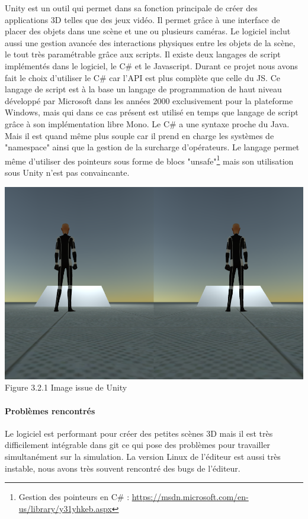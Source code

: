 \documentclass[12pt,a4paper]{report}
\begin{document}
Unity est un outil qui permet dans sa fonction principale de créer des applications 3D telles que des jeux vidéo. Il permet grâce à une interface de placer des objets dans une scène et une ou plusieurs caméras. Le logiciel inclut aussi une gestion avancée des interactions physiques entre les objets de la scène, le tout très paramétrable grâce aux scripts. Il existe deux langages de script implémentés dans le logiciel, le C\# et le Javascript. Durant ce projet nous avons fait le choix d'utiliser le C\# car l'API est plus complète que celle du JS.
Ce langage de script est à la base un langage de programmation de haut niveau développé par Microsoft dans les années 2000 exclusivement pour la plateforme Windows, mais qui dans ce cas présent est utilisé en temps que langage de script grâce à son implémentation libre Mono. Le C\# a une syntaxe proche du Java. Mais il est quand même plus souple car il prend en charge les systèmes de "namespace" ainsi que la gestion de la surcharge d'opérateurs. Le langage permet même d'utiliser des pointeurs sous forme de blocs "unsafe"\footnote{Gestion des pointeurs en C\# : \url{https://msdn.microsoft.com/en-us/library/y31yhkeb.aspx}} mais son utilisation sous Unity n'est pas convaincante.

	\begin{center}
		\includegraphics[scale=0.5]{Screenshot_skybox.png}\\
		Figure 3.2.1 Image issue de Unity\\
	\end{center}
 	
\paragraph{Problèmes rencontrés}
Le logiciel est performant pour créer des petites scènes 3D mais il est très difficilement intégrable dans git ce qui pose des problèmes pour travailler simultanément sur la simulation. La version Linux de l'éditeur est aussi très instable, nous avons très souvent rencontré des bugs de l'éditeur.
\end{document}
